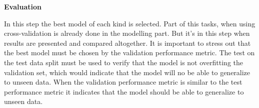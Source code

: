\textbf{Evaluation}

In this step the best model of each kind is selected. Part of this tasks, when using cross-validation is already done in the modelling part. But it's in this step when results are presented and compared altogether. 
It is important to stress out that the best model must be chosen by the validation performance metric. The test on the test data split must be used to verify that the model is not overfitting the validation set, which would indicate that the model will no be able to generalize to unseen data. When the validation performance metric is similar to the test performance metric it indicates that the model should be able to generalize to unseen data.




